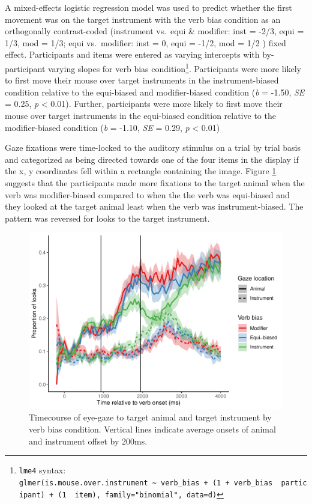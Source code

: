 \documentclass[
  man,floatsintext]{apa6}
\begin{document}
A mixed-effects logistic regression model was used to predict whether the first movement was on the target instrument with the verb bias condition as an orthogonally contrast-coded (instrument vs.~equi \& modifier: inst = -2/3, equi = 1/3, mod = 1/3; equi vs.~modifier: inst = 0, equi = -1/2, mod = 1/2 ) fixed effect. Participants and items were entered as varying intercepts with by-participant varying slopes for verb bias condition\footnote{\texttt{lme4} syntax: \texttt{glmer(is.mouse.over.instrument\ \textasciitilde{}\ verb\_bias\ +\ (1\ +\ verb\_bias\ \textbar{}\ participant)\ +\ (1\ \textbar{}\ item),\ family="binomial",\ data=d)}}. Participants were more likely to first move their mouse over target instruments in the instrument-biased condition relative to the equi-biased and modifier-biased condition (\emph{b} = -1.50, \emph{SE} = 0.25, \emph{p} \textless{} 0.01). Further, participants were more likely to first move their mouse over target instruments in the equi-biased condition relative to the modifier-biased condition (\emph{b} = -1.10, \emph{SE} = 0.29, \emph{p} \textless{} 0.01)

Gaze fixations were time-locked to the auditory stimulus on a trial by trial basis and categorized as being directed towards one of the four items in the display if the x, y coordinates fell within a rectangle containing the image. Figure \ref{fig:E4-gaze-timecourse-fig} suggests that the participants made more fixations to the target animal when the verb was modifier-biased compared to when the the verb was equi-biased and they looked at the target animal least when the verb was instrument-biased. The pattern was reversed for looks to the target instrument.

\begin{figure}
\centering
\includegraphics{manuscript_files/figure-latex/E4-gaze-timecourse-fig-1.pdf}
\caption{\label{fig:E4-gaze-timecourse-fig}Timecourse of eye-gaze to target animal and target instrument by verb bias condition. Vertical lines indicate average onsets of animal and instrument offset by 200ms.}
\end{figure}
\end{document}
